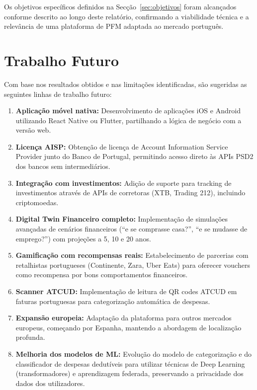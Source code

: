 Os objetivos específicos definidos na Secção~\ref{sec:objetivos} foram alcançados conforme descrito ao longo deste relatório, confirmando a viabilidade técnica e a relevância de uma plataforma de \ac{PFM} adaptada ao mercado português.


\section{Trabalho Futuro}
\label{sec:trab-futuro}

Com base nos resultados obtidos e nas limitações identificadas, são sugeridas as seguintes linhas de trabalho futuro:

\begin{enumerate}
    \item \textbf{Aplicação móvel nativa:} Desenvolvimento de aplicações iOS e Android utilizando React Native ou Flutter, partilhando a lógica de negócio com a versão web.

    \item \textbf{Licença AISP:} Obtenção de licença de Account Information Service Provider junto do Banco de Portugal, permitindo acesso direto às \ac{API}s \ac{PSD2} dos bancos sem intermediários.

    \item \textbf{Integração com investimentos:} Adição de suporte para tracking de investimentos através de \ac{API}s de corretoras (XTB, Trading 212), incluindo criptomoedas.

    \item \textbf{Digital Twin Financeiro completo:} Implementação de simulações avançadas de cenários financeiros (``e se comprasse casa?'', ``e se mudasse de emprego?'') com projeções a 5, 10 e 20 anos.

    \item \textbf{Gamificação com recompensas reais:} Estabelecimento de parcerias com retalhistas portugueses (Continente, Zara, Uber Eats) para oferecer vouchers como recompensa por bons comportamentos financeiros.

    \item \textbf{Scanner ATCUD:} Implementação de leitura de QR codes \ac{ATCUD} em faturas portuguesas para categorização automática de despesas.

    \item \textbf{Expansão europeia:} Adaptação da plataforma para outros mercados europeus, começando por Espanha, mantendo a abordagem de localização profunda.

    \item \textbf{Melhoria dos modelos de ML:} Evolução do modelo de categorização e do classificador de despesas dedutíveis para utilizar técnicas de Deep Learning (transformadores) e aprendizagem federada, preservando a privacidade dos dados dos utilizadores.


\end{enumerate}
